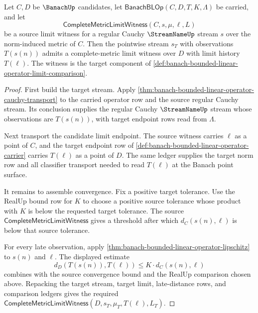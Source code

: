 \begin{theorem}
\label{thm:banach-bounded-linear-operator-limit-witness-transport}
Let $C,D$ be $\BanachUp$ candidates, let
$\mathsf{BanachBLOp}(C,D,T,K,\Lambda)$ be carried, and let
$$
\mathsf{CompleteMetricLimitWitness}(C,s,\mu,\ell,L)
$$
be a source limit witness for a regular Cauchy $\StreamNameUp$ stream $s$ over
the norm-induced metric of $C$. Then the pointwise stream $s_T$ with
observations $T(s(n))$ admits a complete-metric limit witness over $D$ with
limit history $T(\ell)$. The witness is the target component of
\autoref{def:banach-bounded-linear-operator-limit-comparison}.
\end{theorem}
\begin{proof}
First build the target stream. Apply
\autoref{thm:banach-bounded-linear-operator-cauchy-transport} to the carried
operator row and the source regular Cauchy stream. Its conclusion supplies the
regular Cauchy $\StreamNameUp$ stream whose observations are $T(s(n))$, with
target endpoint rows read from $\Lambda$.

Next transport the candidate limit endpoint. The source witness carries
$\ell$ as a point of $C$, and the target endpoint row of
\autoref{def:banach-bounded-linear-operator-carrier} carries $T(\ell)$ as a
point of $D$. The same ledger supplies the target norm row and all classifier
transport needed to read $T(\ell)$ at the Banach point surface.

It remains to assemble convergence. Fix a positive target tolerance. Use the
RealUp bound row for $K$ to choose a positive source tolerance whose product
with $K$ is below the requested target tolerance. The source
$\mathsf{CompleteMetricLimitWitness}$ gives a threshold after which
$d_C(s(n),\ell)$ is below that source tolerance.

For every late observation, apply
\autoref{thm:banach-bounded-linear-operator-lipschitz} to $s(n)$ and $\ell$.
The displayed estimate
$$
d_D(T(s(n)),T(\ell))\le K\cdot d_C(s(n),\ell)
$$
combines with the source convergence bound and the RealUp comparison chosen
above. Repacking the target stream, target limit, late-distance rows, and
comparison ledgers gives the required
$\mathsf{CompleteMetricLimitWitness}(D,s_T,\mu_T,T(\ell),L_T)$.
\end{proof}

